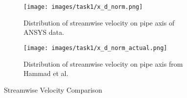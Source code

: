 \begin{figure}[H]
 \centering
\begin{subfigure}{.7\textwidth}
  \centering
  \texttt{[image: images/task1/x\_d\_norm.png]}
  \caption{Distribution of streamwise velocity on pipe axis of ANSYS data.}
  \label{fig:x_d_norm}
\end{subfigure}%

\begin{subfigure}{.8\textwidth}
  \centering
  \texttt{[image: images/task1/x\_d\_norm\_actual.png]}
  \caption{Distribution of streamwise velocity on pipe axis from Hammad et al.\cite{hammad_ötügen_arik_1999}}
  \label{fig:x_d_norm_actual}
\end{subfigure}

\caption{Streamwise Velocity Comparison}
\label{fig:xd_norm}
\end{figure}
